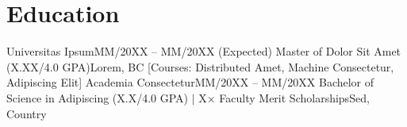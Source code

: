 \section{Education}
  \resumeSubHeadingListStart
      \resumeSubheadingWithCourses
      {Universitas Ipsum}{MM/20XX -- MM/20XX (Expected)}
      {Master of Dolor Sit Amet (X.XX/4.0 GPA)}{Lorem, BC}
      {[Courses: Distributed Amet, Machine Consectetur, Adipiscing Elit]}
    \resumeSubheading
      {Academia Consectetur}{MM/20XX -- MM/20XX}
      {Bachelor of Science in Adipiscing (X.X/4.0 GPA) $|$ X× Faculty Merit Scholarships}{Sed, Country}
  \resumeSubHeadingListEnd
\sectionGap
